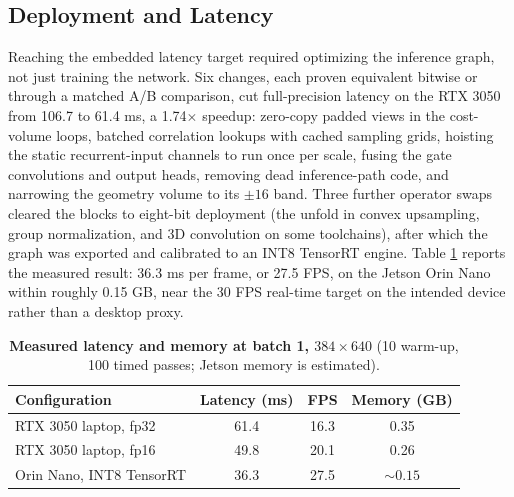 \documentclass[conference]{IEEEtran}
\begin{document}
\subsection{Deployment and Latency}
Reaching the embedded latency target required optimizing the inference graph, not just training the network. Six changes, each proven equivalent bitwise or through a matched A/B comparison, cut full-precision latency on the RTX 3050 from 106.7 to 61.4 ms, a 1.74$\times$ speedup: zero-copy padded views in the cost-volume loops, batched correlation lookups with cached sampling grids, hoisting the static recurrent-input channels to run once per scale, fusing the gate convolutions and output heads, removing dead inference-path code, and narrowing the geometry volume to its $\pm 16$ band. Three further operator swaps cleared the blocks to eight-bit deployment (the unfold in convex upsampling, group normalization, and 3D convolution on some toolchains), after which the graph was exported and calibrated to an INT8 TensorRT engine. Table \ref{tab:latency} reports the measured result: 36.3 ms per frame, or 27.5 FPS, on the Jetson Orin Nano within roughly 0.15 GB, near the 30 FPS real-time target on the intended device rather than a desktop proxy.

\begin{table}[!htbp]
\centering
\caption{\textbf{Measured latency and memory at batch 1, $384\times 640$} (10 warm-up, 100 timed passes; Jetson memory is estimated).}
\label{tab:latency}
\footnotesize
\setlength{\tabcolsep}{3.4pt}
\begin{tabular}{lccc}
\toprule
Configuration & Latency (ms) & FPS & Memory (GB)\\
\midrule
RTX 3050 laptop, fp32 & 61.4 & 16.3 & 0.35\\
RTX 3050 laptop, fp16 & 49.8 & 20.1 & 0.26\\
Orin Nano, INT8 TensorRT & 36.3 & 27.5 & ${\sim}0.15$\\
\bottomrule
\end{tabular}
\end{table}
\end{document}
